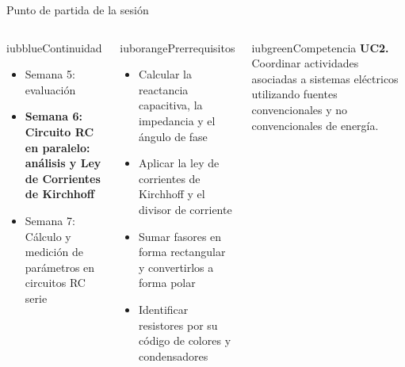 \documentclass[aspectratio=169,11pt,xcolor={table}]{beamer}
\begin{document}
\begin{frame}{Punto de partida de la sesión}
\begin{columns}[T,onlytextwidth]
\begin{caja}[height=5.9cm]{iubblue}{Continuidad}
\scriptsize \begin{itemize}\setlength{\itemsep}{2pt}
  \item Semana 5: evaluación
  \item \textbf{Semana 6: Circuito RC en paralelo: análisis y Ley de Corrientes de Kirchhoff}
  \item Semana 7: Cálculo y medición de parámetros en circuitos RC serie
\end{itemize}
\end{caja}
\begin{caja}[height=5.9cm]{iuborange}{Prerrequisitos}
\scriptsize \begin{itemize}\setlength{\itemsep}{2pt}
  \item Calcular la reactancia capacitiva, la impedancia y el ángulo de fase
  \item Aplicar la ley de corrientes de Kirchhoff y el divisor de corriente
  \item Sumar fasores en forma rectangular y convertirlos a forma polar
  \item Identificar resistores por su código de colores y condensadores
\end{itemize}
\end{caja}
\begin{caja}[height=5.9cm]{iubgreen}{Competencia}
\scriptsize \textbf{UC2.} Coordinar actividades asociadas a sistemas eléctricos utilizando fuentes convencionales y no convencionales de energía.
\end{caja}
\end{columns}
\end{frame}
\end{document}
